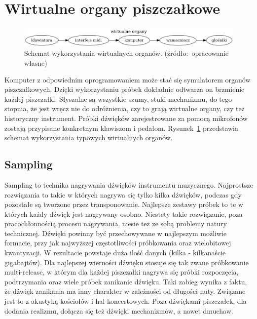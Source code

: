 \documentclass[11pt]{report}
\begin{document}
    \section{Wirtualne organy piszczałkowe}\label{sec:wirtualne-organy-piszczałkowe}

    \begin{figure}[!ht]
        \centering
        \includegraphics[width=\linewidth]{fig/organizacja.png}
        \caption{Schemat wykorzystania wirtualnych organów. (źródło:~opracowanie własne)}
        \label{fig:schemat}
    \end{figure}

    Komputer z odpowiednim oprogramowaniem może stać się symulatorem organów piszczałkowych.
    Dzięki wykorzystaniu próbek dokładnie odtwarza on brzmienie każdej piszczałki.
    Słyszalne są wszystkie szumy, stuki mechanizmu, do tego stopnia, że jest wręcz nie do odróżnienia, czy to grają wirtualne organy, czy też historyczny instrument.
    Próbki dźwięków zarejestrowane za pomocą mikrofonów zostają przypisane konkretnym klawiszom i pedałom.
    Rysunek~\ref{fig:schemat} przedstawia schemat wykorzystania typowych wirtualnych organów.

    \subsection{Sampling}
    Sampling to technika nagrywania dźwięków instrumentu muzycznego.
    Najprostsze rozwiązania to takie w których nagrywa się tylko kilka dźwięków, podczas gdy pozostałe są tworzone przez transponowanie.
    Najlepsze zestawy próbek to te w których każdy dźwięk jest nagrywany osobno.
    Niestety takie rozwiązanie, poza pracochłonnością procesu nagrywania, niesie też ze sobą problemy natury technicznej.
    Dźwięki powinny być przechowywane w najlepszym możliwie formacie, przy jak najwyższej częstotliwości próbkowania oraz wielobitowej kwantyzacji.
    W rezultacie powstaje duża ilość danych (kilka - kilkanaście gigabajtów).
    Dla najlepszej wierności dźwięku stosuje się tak zwane próbkowanie multi-release,
    w którym dla każdej piszczałki nagrywa się próbki rozpoczęcia, podtrzymania oraz wiele próbek zanikanie dźwięku.
    Taki zabieg wynika z faktu, że dźwięk zanikania ma inny charakter w zależności od długości nuty.
    Związane jest to z akustyką kościołów i hal koncertowych.
    Poza dźwiękami piszczałek, dla dodania realizmu, dołącza się też dźwięki mechanizmów, a nawet dmuchaw.
\end{document}
